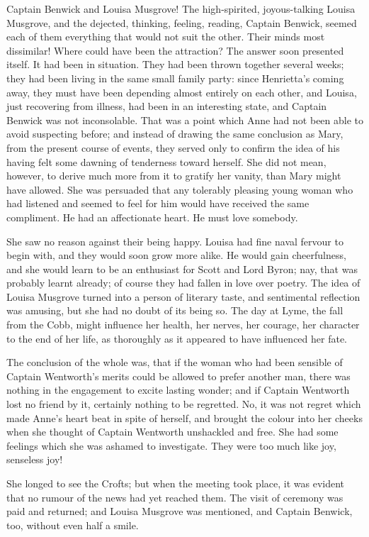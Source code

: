 Captain Benwick and Louisa Musgrove! The high-spirited, joyous-talking Louisa Musgrove, and the dejected, thinking, feeling, reading, Captain Benwick, seemed each of them everything that would not suit the other. Their minds most dissimilar! Where could have been the attraction? The answer soon presented itself. It had been in situation. They had been thrown together several weeks; they had been living in the same small family party: since Henrietta's coming away, they must have been depending almost entirely on each other, and Louisa, just recovering from illness, had been in an interesting state, and Captain Benwick was not inconsolable. That was a point which Anne had not been able to avoid suspecting before; and instead of drawing the same conclusion as Mary, from the present course of events, they served only to confirm the idea of his having felt some dawning of tenderness toward herself. She did not mean, however, to derive much more from it to gratify her vanity, than Mary might have allowed. She was persuaded that any tolerably pleasing young woman who had listened and seemed to feel for him would have received the same compliment. He had an affectionate heart. He must love somebody.

She saw no reason against their being happy. Louisa had fine naval fervour to begin with, and they would soon grow more alike. He would gain cheerfulness, and she would learn to be an enthusiast for Scott and Lord Byron; nay, that was probably learnt already; of course they had fallen in love over poetry. The idea of Louisa Musgrove turned into a person of literary taste, and sentimental reflection was amusing, but she had no doubt of its being so. The day at Lyme, the fall from the Cobb, might influence her health, her nerves, her courage, her character to the end of her life, as thoroughly as it appeared to have influenced her fate.

The conclusion of the whole was, that if the woman who had been sensible of Captain Wentworth's merits could be allowed to prefer another man, there was nothing in the engagement to excite lasting wonder; and if Captain Wentworth lost no friend by it, certainly nothing to be regretted. No, it was not regret which made Anne's heart beat in spite of herself, and brought the colour into her cheeks when she thought of Captain Wentworth unshackled and free. She had some feelings which she was ashamed to investigate. They were too much like joy, senseless joy!

She longed to see the Crofts; but when the meeting took place, it was evident that no rumour of the news had yet reached them. The visit of ceremony was paid and returned; and Louisa Musgrove was mentioned, and Captain Benwick, too, without even half a smile.


